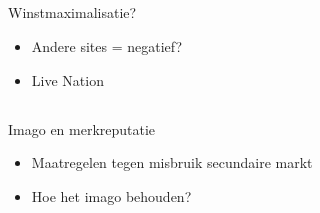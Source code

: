 \documentclass{beamer}
\begin{document}
    \subsection{}
    \begin{frame}{Winstmaximalisatie?}
        \begin{itemize}
            \item Andere sites = negatief?
            \item Live Nation
        \end{itemize}
    \end{frame}

    \subsection{}
    \begin{frame}{Imago en merkreputatie}
        \begin{itemize}
            \item Maatregelen tegen misbruik secundaire markt
            \item Hoe het imago behouden?
        \end{itemize}
    \end{frame}


    
\end{document}

